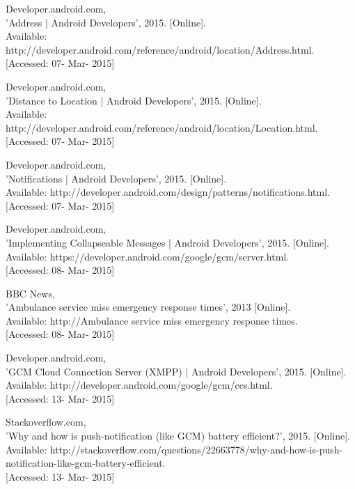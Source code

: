 \documentclass[]{article}
\begin{document}
\begin{enumerate}[label={[\arabic*]}]
\item  Developer.android.com, \\{}'Address | Android Developers', 2015. [Online].\\{} Available: http://developer.android.com/reference/android/location/Address.html. \\{}[Accessed: 07- Mar- 2015]

\item  Developer.android.com, \\{}'Distance to Location | Android Developers', 2015. [Online].\\{} Available: http://developer.android.com/reference/android/location/Location.html. \\{}[Accessed: 07- Mar- 2015]

\item  Developer.android.com,\\{} 'Notifications | Android Developers', 2015. [Online].\\{} Available: http://developer.android.com/design/patterns/notifications.html.\\{} [Accessed: 07- Mar- 2015]

\item  Developer.android.com,\\{} 'Implementing Collapseable Messages | Android Developers', 2015. [Online].\\{} Available: https://developer.android.com/google/gcm/server.html.\\{}[Accessed: 08- Mar- 2015]

\item  BBC News,\\{} 'Ambulance service miss emergency response times', 2013 [Online].\\{} Available: http://Ambulance service miss emergency response times. \\{}[Accessed: 08- Mar- 2015]

\item  Developer.android.com, \\{}'GCM Cloud Connection Server (XMPP) | Android Developers', 2015. [Online].\\{} Available: http://developer.android.com/google/gcm/ccs.html. \\{}[Accessed: 13- Mar- 2015]

\item  Stackoverflow.com,\\{} 'Why and how is push-notification (like GCM) battery efficient?', 2015. [Online].\\{} Available: http://stackoverflow.com/questions/22663778/why-and-how-is-push-notification-like-gcm-battery-efficient. \\{}[Accessed: 13- Mar- 2015]


\end{enumerate}
\end{document}
